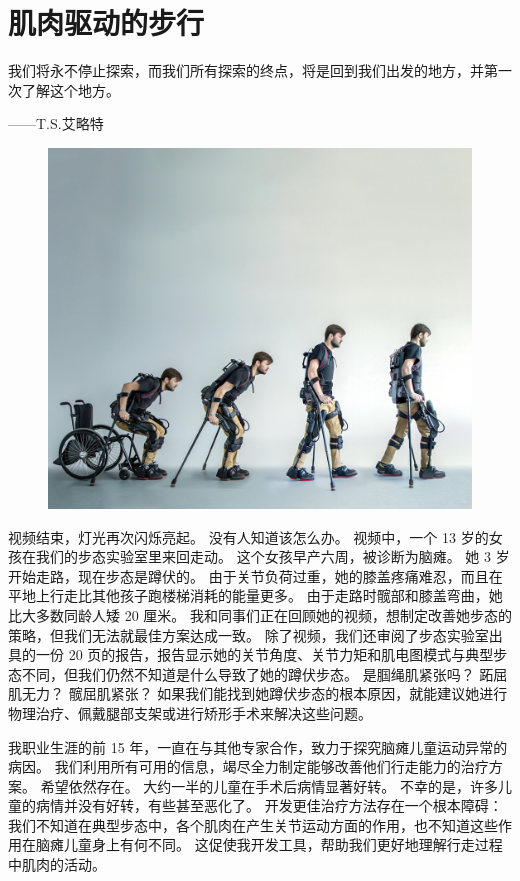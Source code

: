 \chapter{肌肉驱动的步行} \label{chap:chap11}

我们将永不停止探索，而我们所有探索的终点，将是回到我们出发的地方，并第一次了解这个地方。
\begin{flushright}
	——T.S.艾略特
\end{flushright}


\begin{figure}[!htb]
	\centering
	\includegraphics[width=1.0\linewidth]{chap11/11_0}
	\caption*{ \label{fig:11_0}}
\end{figure}


视频结束，灯光再次闪烁亮起。
没有人知道该怎么办。
视频中，一个 13 岁的女孩在我们的步态实验室里来回走动。
这个女孩早产六周，被诊断为脑瘫。
她 3 岁开始走路，现在步态是蹲伏的。
由于关节负荷过重，她的膝盖疼痛难忍，而且在平地上行走比其他孩子跑楼梯消耗的能量更多。
由于走路时髋部和膝盖弯曲，她比大多数同龄人矮 20 厘米。
我和同事们正在回顾她的视频，想制定改善她步态的策略，但我们无法就最佳方案达成一致。
除了视频，我们还审阅了步态实验室出具的一份 20 页的报告，报告显示她的关节角度、关节力矩​​和肌电图模式与典型步态不同，但我们仍然不知道是什么导致了她的蹲伏步态。
是腘绳肌紧张吗？
跖屈肌无力？
髋屈肌紧张？
如果我们能找到她蹲伏步态的根本原因，就能建议她进行物理治疗、佩戴腿部支架或进行矫形手术来解决这些问题。


我职业生涯的前 15 年，一直在与其他专家合作，致力于探究脑瘫儿童运动异常的病因。
我们利用所有可用的信息，竭尽全力制定能够改善他们行走能力的治疗方案。
希望依然存在。
大约一半的儿童在手术后病情显著好转。
不幸的是，许多儿童的病情并没有好转，有些甚至恶化了。
开发更佳治疗方法存在一个根本障碍：我们不知道在典型步态中，各个肌肉在产生关节运动方面的作用，也不知道这些作用在脑瘫儿童身上有何不同。
这促使我开发工具，帮助我们更好地理解行走过程中肌肉的活动。


